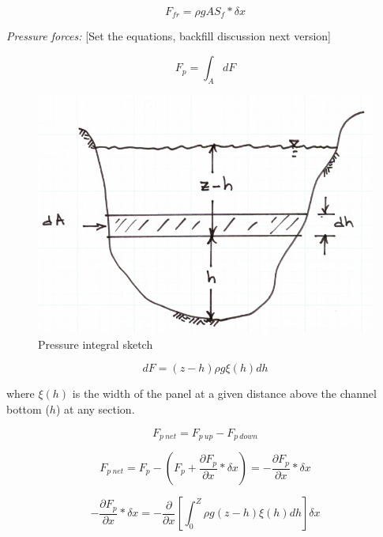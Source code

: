 \begin{equation}
F_{fr} =  \rho g A S_f * \delta x
\end{equation}


\textsl{Pressure forces:}   
[Set the equations, backfill discussion next version]

\begin{equation}
F_p = \int_{A} {dF}
\end{equation}

\begin{figure}[h!] %
   \centering
   \includegraphics[width=5in]{pressure_sketch.jpg} 
   \caption{Pressure integral sketch}
   \label{fig:pressure_sketch}
\end{figure}

\begin{equation}
dF = (z-h)\rho g \xi (h) dh
\end{equation}

where $\xi (h)$ is the width of the panel at a given distance above the channel bottom ($h$) at any section.

\begin{equation}
F_{p~net} = F_{p~up} - F_{p~down}
\end{equation}

\begin{equation}
F_{p~net} = F_p -( F_p + \frac{\partial F_p}{\partial x}*\delta x) = - \frac{\partial F_p}{\partial x}*\delta x
\end{equation}

\begin{equation}
 - \frac{\partial F_p}{\partial x}*\delta x = -\frac{\partial}{\partial x}[\int_{0}^{Z}\rho g (z-h) \xi(h) dh ] \delta x
\end{equation}

